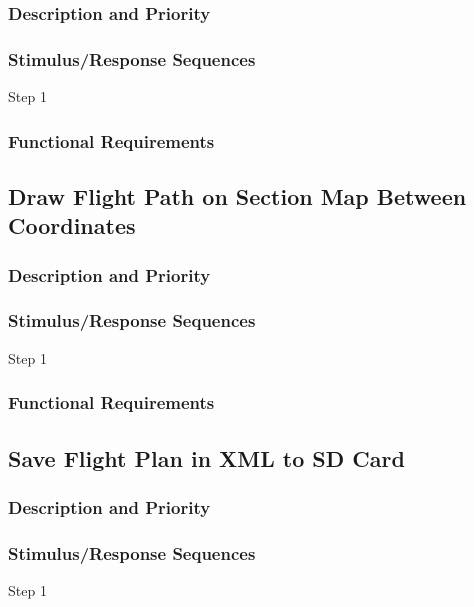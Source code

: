 \documentclass[12pt, letterpaper]{article}
\begin{document}
      \subsubsection{Description and Priority}
      \subsubsection{Stimulus/Response Sequences}
        \begin{description}
          \item[Step 1]
        \end{description}
      \subsubsection{Functional Requirements}

      \subsection{Draw Flight Path on Section Map Between Coordinates}
        \subsubsection{Description and Priority}
        \subsubsection{Stimulus/Response Sequences}
          \begin{description}
            \item[Step 1]
          \end{description}
        \subsubsection{Functional Requirements}

        \subsection{Save Flight Plan in XML to SD Card}
          \subsubsection{Description and Priority}
          \subsubsection{Stimulus/Response Sequences}
            \begin{description}
              \item[Step 1]
            \end{description}
\end{document}
